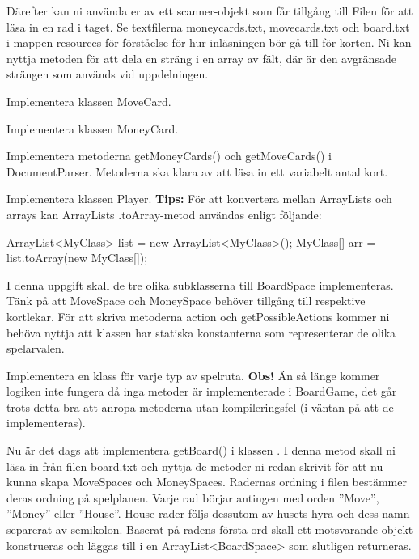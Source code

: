 Därefter kan ni använda er av ett scanner-objekt som får tillgång till Filen för att läsa in en rad i taget.
Se textfilerna moneycards.txt, movecards.txt och board.txt i mappen resources för förståelse för hur inläsningen bör gå till för korten. \newline Ni kan nyttja metoden  för att dela en sträng i en array av fält, där  är den avgränsade strängen som används vid uppdelningen.

\Subtask Implementera klassen MoveCard.

\Subtask Implementera klassen MoneyCard.

\Subtask Implementera metoderna getMoneyCards() och getMoveCards() i DocumentParser. Metoderna ska klara av att läsa in ett variabelt antal kort.

\Subtask Implementera klassen Player.
\newline
\newline
\textbf{Tips:}
För att konvertera mellan ArrayLists och arrays kan ArrayLists .toArray-metod användas enligt följande:

\begin{Code}
ArrayList<MyClass> list = new ArrayList<MyClass>();
MyClass[] arr = list.toArray(new MyClass[]{});
\end{Code}

\Task I denna uppgift skall de tre olika subklasserna till BoardSpace implementeras. Tänk på att MoveSpace och MoneySpace behöver tillgång till respektive kortlekar.
För att skriva metoderna action och getPossibleActions kommer ni behöva nyttja att klassen  har statiska konstanterna som representerar de olika spelarvalen.


\Subtask Implementera en klass för varje typ av spelruta. 
\newline
\newline
\noindent
\textbf{Obs!} Än så länge kommer logiken inte fungera då inga metoder är implementerade i BoardGame, det går trots detta bra att anropa metoderna utan kompileringsfel (i väntan på att de implementeras).



\Task Nu är det dags att implementera getBoard() i klassen . I denna metod skall ni läsa in från filen board.txt och nyttja de metoder ni redan skrivit för att nu kunna skapa MoveSpaces och MoneySpaces. Radernas ordning i filen bestämmer deras ordning på spelplanen. Varje rad börjar antingen med orden ''Move'', ''Money'' eller ''House''. House-rader följs dessutom av husets hyra och dess namn separerat av semikolon. Baserat på radens första ord skall ett motsvarande objekt konstrueras och läggas till i en ArrayList<BoardSpace> som slutligen returneras.



